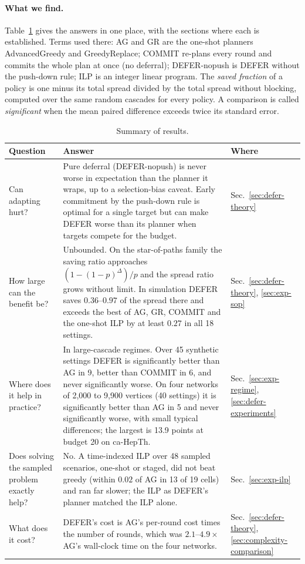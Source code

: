 \documentclass[11pt]{article}
\theoremstyle{definition}
\theoremstyle{remark}
\newcommand{\up}{\rule{0pt}{2.6ex}}
\begin{document}
\paragraph{What we find.} Table~\ref{tab:summary} gives the answers in one place, with the sections where each is established. Terms used there: AG and GR are the one-shot planners AdvancedGreedy and GreedyReplace; COMMIT re-plans every round and commits the whole plan at once (no deferral); DEFER-nopush is DEFER without the push-down rule; ILP is an integer linear program. The \emph{saved fraction} of a policy is one minus its total spread divided by the total spread without blocking, computed over the same random cascades for every policy. A comparison is called \emph{significant} when the mean paired difference exceeds twice its standard error.

\begin{table}[h]
\centering
\caption{Summary of results.}\label{tab:summary}
\small
\begin{tabular}{@{}p{}p{}p{}@{}}
\hline
\up Question & Answer & Where \\
\hline
\up Can adapting hurt? & Pure deferral (DEFER-nopush) is never worse in expectation than the planner it wraps, up to a selection-bias caveat. Early commitment by the push-down rule is optimal for a single target but can make DEFER worse than its planner when targets compete for the budget. & Sec.~\ref{sec:defer-theory} \\
How large can the benefit be? & Unbounded. On the star-of-paths family the saving ratio approaches $(1-(1-p)^\Delta)/p$ and the spread ratio grows without limit. In simulation DEFER saves $0.36$--$0.97$ of the spread there and exceeds the best of AG, GR, COMMIT and the one-shot ILP by at least $0.27$ in all 18 settings. & Sec.~\ref{sec:defer-theory}, \ref{sec:exp-sop} \\
Where does it help in practice? & In large-cascade regimes. Over 45 synthetic settings DEFER is significantly better than AG in 9, better than COMMIT in 6, and never significantly worse. On four networks of 2,000 to 9,900 vertices (40 settings) it is significantly better than AG in 5 and never significantly worse, with small typical differences; the largest is 13.9 points at budget 20 on ca-HepTh. & Sec.~\ref{sec:exp-regime}, \ref{sec:defer-experiments}\\
Does solving the sampled problem exactly help? & No. A time-indexed ILP over 48 sampled scenarios, one-shot or staged, did not beat greedy (within $0.02$ of AG in 13 of 19 cells) and ran far slower; the ILP as DEFER's planner matched the ILP alone. & Sec.~\ref{sec:exp-ilp} \\
What does it cost? & DEFER's cost is AG's per-round cost times the number of rounds, which was $2.1$--$4.9\times$ AG's wall-clock time on the four networks. & Sec.~\ref{sec:defer-theory}, \ref{sec:complexity-comparison}\\
\hline
\end{tabular}
\end{table}
\end{document}
